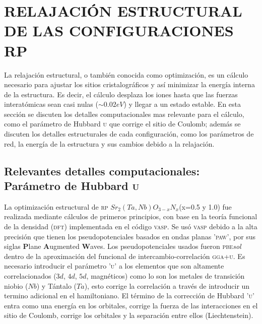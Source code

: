 \section{RELAJACIÓN ESTRUCTURAL DE LAS CONFIGURACIONES RP}\label{Sec. 2.2}

La relajación estructural, o también conocida como optimización, es un cálculo necesario para ajustar los sitios cristalográficos y así minimizar la energía interna de la estructura. Es decir, el cálculo desplaza los iones hasta que las fuerzas interatómicas sean casi nulas ($\sim0.02 eV$) y llegar a un estado estable. En esta sección se discuten los detalles computacionales mas relevante para el cálculo, como el parámetro de Hubbard \textsc{u} que corrige el sitio de Coulomb; además se discuten los detalles estructurales de cada configuración, como los parámetros de red, la energía de la estructura y sus cambios debido a la relajación.

\subsection{Relevantes detalles computacionales: Parámetro de Hubbard \textsc{u}}

La optimización estructural de \textsc{rp} $Sr_{2}(Ta,Nb)O_{3-x}N_{x}$(x=0.5 y 1.0) fue realizada mediante cálculos de primeros principios, con base en la teoría funcional de la densidad (\textsc{dft}) implementada en el código \textsc{vasp}\cite{urlvasp}. Se usó \textsc{vasp} debido a la alta precisión que tienen los pseudopotenciales basados en ondas planas \textsc{'paw'}, por sus siglas \textbf{P}lane \textbf{A}ugmented \textbf{W}aves. Los pseudopotenciales usados fueron \textsc{pbe}\textit{sol} dentro de la aproximación del funcional de intercambio-correlación \textsc{gga+u}. Es necesario introducir el parámetro \textsc{'u'} a los elementos que son altamente correlacionados ($3d$, $4d$, $5d$, magnéticos) como lo son los metales de transición niobio ($Nb$) y Tántalo ($Ta$), esto corrige la correlación a través de introducir un termino adicional en el hamiltoniano. El término de la corrección de Hubbard \textsc{'u'} entra como una energía en los orbitales, corrige la fuerza de las interacciones en el sitio de Coulomb, corrige los orbitales y la separación entre ellos (Liechtenstein\cite{Lichtenstein1995StrongOrdering}).

